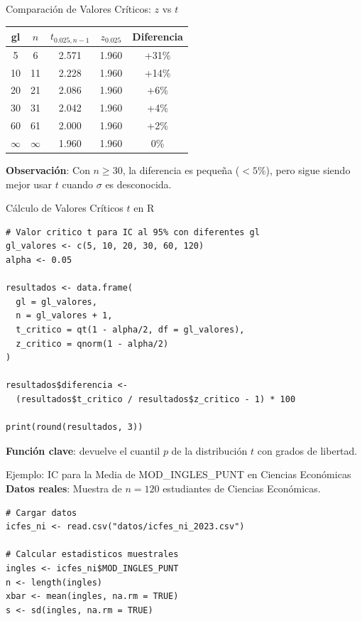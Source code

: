 \documentclass[aspectratio=169, 11pt]{beamer}
\begin{document}
\begin{frame}{Comparación de Valores Críticos: $z$ vs $t$}
\begin{table}
\centering
\small
\begin{tabular}{ccccc}
\toprule
\textbf{gl} & $n$ & $t_{0.025, n-1}$ & $z_{0.025}$ & Diferencia \\
\midrule
5  & 6   & 2.571 & 1.960 & +31\% \\
10 & 11  & 2.228 & 1.960 & +14\% \\
20 & 21  & 2.086 & 1.960 & +6\% \\
30 & 31  & 2.042 & 1.960 & +4\% \\
60 & 61  & 2.000 & 1.960 & +2\% \\
$\infty$ & $\infty$ & 1.960 & 1.960 & 0\% \\
\bottomrule
\end{tabular}
\end{table}

\vspace{0.3cm}
\textbf{Observación}: Con $n \geq 30$, la diferencia es pequeña ($<5\%$), pero sigue siendo mejor usar $t$ cuando $\sigma$ es desconocida.
\end{frame}

\begin{frame}[fragile]{Cálculo de Valores Críticos $t$ en R}
\begin{lstlisting}
# Valor critico t para IC al 95% con diferentes gl
gl_valores <- c(5, 10, 20, 30, 60, 120)
alpha <- 0.05

resultados <- data.frame(
  gl = gl_valores,
  n = gl_valores + 1,
  t_critico = qt(1 - alpha/2, df = gl_valores),
  z_critico = qnorm(1 - alpha/2)
)

resultados$diferencia <-
  (resultados$t_critico / resultados$z_critico - 1) * 100

print(round(resultados, 3))
\end{lstlisting}

\vspace{0.3cm}
\textbf{Función clave}:  devuelve el cuantil $p$ de la distribución $t$ con  grados de libertad.
\end{frame}

\begin{frame}[fragile]{Ejemplo: IC para la Media de MOD\_INGLES\_PUNT en Ciencias Econ\'omicas}
\textbf{Datos reales}: Muestra de $n = 120$ estudiantes de Ciencias Econ\'omicas.

\begin{lstlisting}
# Cargar datos
icfes_ni <- read.csv("datos/icfes_ni_2023.csv")

# Calcular estadisticos muestrales
ingles <- icfes_ni$MOD_INGLES_PUNT
n <- length(ingles)
xbar <- mean(ingles, na.rm = TRUE)
s <- sd(ingles, na.rm = TRUE)
\end{lstlisting}
\end{frame}
\end{document}
